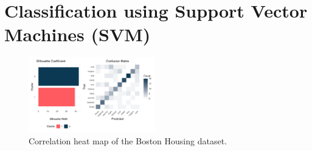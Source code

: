 \documentclass[twocolumn]{article}
\begin{document}
\blindtext

\section{Classification using Support Vector Machines (SVM)}
\begin{figure}[hht]
	\centering
	\includegraphics[width=0.49\textwidth]{images/clust_class.pdf}
  \caption{Correlation heat map of the Boston Housing dataset.}
	\label{fig:corr}
\end{figure}

\blindtext


\end{document}
